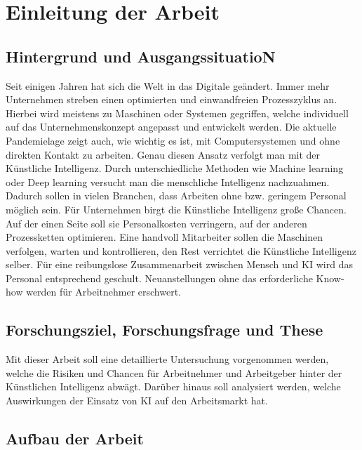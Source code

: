 \chapter{Einleitung der Arbeit}

\section{Hintergrund und AusgangssituatioN}

Seit einigen Jahren hat sich die Welt in das Digitale geändert. Immer mehr Unternehmen streben einen optimierten und einwandfreien Prozesszyklus an. Hierbei wird meistens zu Maschinen oder Systemen
gegriffen, welche individuell auf das Unternehmenskonzept angepasst und entwickelt werden. Die aktuelle Pandemielage zeigt auch, wie wichtig es ist, mit Computersystemen und ohne direkten Kontakt zu arbeiten.
Genau diesen Ansatz verfolgt man mit der Künstliche Intelligenz. Durch unterschiedliche Methoden wie Machine learning oder Deep learning versucht man die menschliche Intelligenz nachzuahmen. Dadurch sollen in vielen
Branchen, dass Arbeiten ohne bzw. geringem Personal möglich sein. Für Unternehmen birgt die Künstliche Intelligenz große Chancen. Auf der einen Seite soll sie Personalkosten verringern, auf der anderen Prozessketten
optimieren. Eine handvoll Mitarbeiter sollen die Maschinen verfolgen, warten und kontrollieren, den Rest verrichtet die Künstliche Intelligenz selber. Für eine 
reibungslose Zusammenarbeit zwischen Mensch und KI wird das Personal entsprechend geschult. Neuanstellungen ohne das erforderliche Know-how werden für Arbeitnehmer 
erschwert.   



\section{Forschungsziel, Forschungsfrage und These}

Mit dieser Arbeit soll eine detaillierte Untersuchung vorgenommen werden, welche die Risiken und Chancen für Arbeitnehmer und Arbeitgeber 
hinter der Künstlichen Intelligenz abwägt. Darüber hinaus soll analysiert werden, welche Auswirkungen der Einsatz von KI auf den Arbeitsmarkt hat. 

\section{Aufbau der Arbeit}

